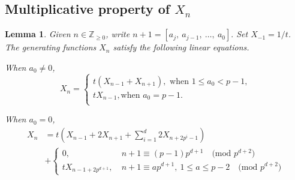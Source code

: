 \documentclass[11 pt]{amsart}
\theoremstyle{plain}
\newtheorem{lemma}[thm]{Lemma}
\theoremstyle{definition}
\theoremstyle{remark}
\def\Z{\mathbb{Z}}
\begin{document}
\subsection{Multiplicative property of $X_n$}

\begin{lemma} \label{lineareqofX_n}
    Given $n\in \Z_{\ge 0}$, write $n+1=[a_j,\ a_{j-1},\ \ldots,\ a_0].$
    Set $X_{-1}=1/t$. 
    The generating functions $X_n$ satisfy the following linear equations.  

When $a_0 \neq 0$,
\begin{equation} \label{eq3}
X_n=
    \begin{cases}
        t(X_{n-1}+X_{n+1}), \text{ when } 1 \le a_0 < p-1,\\
        t X_{n-1}, \text{when } a_0=p-1.\\
        \end{cases}
\end{equation}

When $a_0=0$,
\begin{equation} \label{eq2}  
\begin{aligned} 
    X_n&=t(X_{n-1}+2X_{n+1}+\sum_{i=1}^d 2X_{n+2p^i-1})\\
    &+\begin{cases}
        0,\ &n+1\equiv (p-1)p^{d+1} 
\quad  \text{(mod $p^{d+2}$)}\\
        tX_{n-1+2p^{d+1}},\ &n+1\equiv ap^{d+1},\ 1\le a \le p-2 \quad \text{(mod $p^{d+2}$)} 
        \end{cases} 
\end{aligned}
   \end{equation}
\end{lemma}
\end{document}
